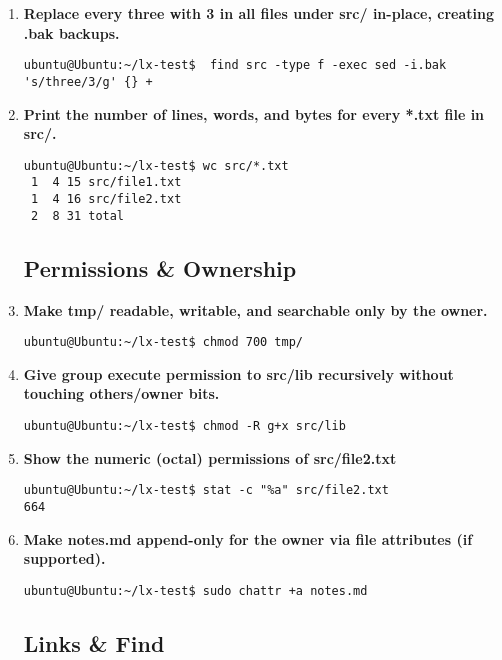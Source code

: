 \begin{enumerate}[leftmargin=2em]
  \item \textbf{Replace every three with 3 in all files under src/ in-place, creating .bak backups.}
\begin{Verbatim}[formatcom=\color{blue}]
ubuntu@Ubuntu:~/lx-test$  find src -type f -exec sed -i.bak 's/three/3/g' {} +
\end{Verbatim}

  \item \textbf{Print the number of lines, words, and bytes for every *.txt file in src/.}
\begin{Verbatim}[formatcom=\color{blue}]
ubuntu@Ubuntu:~/lx-test$ wc src/*.txt
 1  4 15 src/file1.txt
 1  4 16 src/file2.txt
 2  8 31 total
\end{Verbatim}

\subsection{Permissions \& Ownership}

  \item \textbf{Make tmp/ readable, writable, and searchable only by the owner.}
\begin{Verbatim}[formatcom=\color{blue}]
ubuntu@Ubuntu:~/lx-test$ chmod 700 tmp/

\end{Verbatim}

  \item \textbf{Give group execute permission to src/lib recursively without touching others/owner bits.}
\begin{Verbatim}[formatcom=\color{blue}]
ubuntu@Ubuntu:~/lx-test$ chmod -R g+x src/lib
\end{Verbatim}

  \item \textbf{Show the numeric (octal) permissions of src/file2.txt}
\begin{Verbatim}[formatcom=\color{blue}]
ubuntu@Ubuntu:~/lx-test$ stat -c "%a" src/file2.txt
664
\end{Verbatim}

  \item \textbf{Make notes.md append-only for the owner via file attributes (if supported).}
\begin{Verbatim}[formatcom=\color{blue}]
ubuntu@Ubuntu:~/lx-test$ sudo chattr +a notes.md
\end{Verbatim}

\subsection{Links \& Find}


\end{enumerate}
